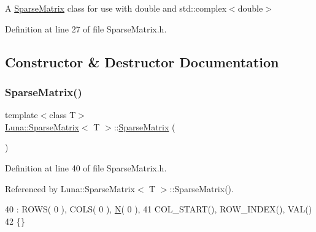 A \hyperlink{classLuna_1_1SparseMatrix}{Sparse\+Matrix} class for use with double and std\+::complex$<$double$>$ 

Definition at line 27 of file Sparse\+Matrix.\+h.



\subsection{Constructor \& Destructor Documentation}
\mbox{\label{classLuna_1_1SparseMatrix_a147a686225e3df44b5a54bc63148406e}} 
\subsubsection{\texorpdfstring{Sparse\+Matrix()}{SparseMatrix()}\hspace{0.1cm}{\footnotesize\ttfamily [1/5]}}
{\footnotesize\ttfamily template$<$class T$>$ \\
\hyperlink{classLuna_1_1SparseMatrix}{Luna\+::\+Sparse\+Matrix}$<$ T $>$\+::\hyperlink{classLuna_1_1SparseMatrix}{Sparse\+Matrix} (\begin{DoxyParamCaption}{ }\end{DoxyParamCaption})\hspace{0.3cm}{\ttfamily [inline]}}



Definition at line 40 of file Sparse\+Matrix.\+h.



Referenced by Luna\+::\+Sparse\+Matrix$<$ T $>$\+::\+Sparse\+Matrix().


\begin{DoxyCode}
40                    : ROWS( 0 ), COLS( 0 ), \hyperlink{namespaceHeat__plot_a7d050092798e28458a263710837bda77}{N}( 0 ),
41                   COL\_START(), ROW\_INDEX(), VAL()
42     \{\}
\end{DoxyCode}
\mbox{\label{classLuna_1_1SparseMatrix_a8d3269958ed81af2b9b17bb79806cec1}} 
